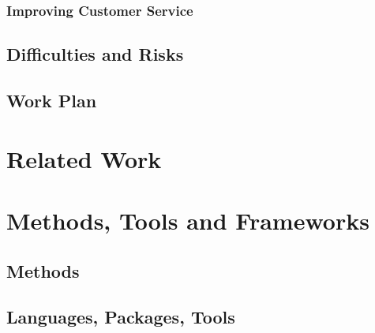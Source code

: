 \documentclass[11pt]{article}
\begin{document}
\subsubsection{Improving Customer Service}


\subsection{Difficulties and Risks}


\subsection{Work Plan}


\section{Related Work}

\section{Methods, Tools and Frameworks}

\subsection{Methods}

   



             
\subsection{Languages, Packages, Tools}
\end{document}
